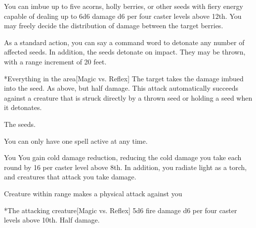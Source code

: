 \begin{spellheader}
\end{spellheader}
\begin{spelleffects}
    \spelleffect You can imbue up to five acorns, holly berries, or other seeds with fiery energy capable of dealing up to 6d6 damage \add d6 per four caster levels above 12th. You may freely decide the distribution of damage between the target berries.

    As a standard action, you can say a command word to detonate any number of affected seeds. In addition, the seeds detonate on impact. They may be thrown, with a range increment of 20 feet.
    \begin{spelltarget}*{Everything in the area}[Magic vs. Reflex]
        \spellsuccess The target takes the damage imbued into the seed.
        \spellfailure As above, but half damage.
        \spellspecial This attack automatically succeeds against a creature that is struck directly by a thrown seed or holding a seed when it detonates.
    \end{spelltarget}
     The seeds.
\end{spelleffects}
\begin{spellfooter}
    \spellnotes You can only have one  spell active at any time.
\end{spellfooter}

\begin{spellheader}
    \spelldur{\durshort \dismissable}
\end{spellheader}
\begin{spelleffects}
    \begin{spelltarget}{You}
        \spelleffect You gain cold damage reduction, reducing the cold damage you take each round by 16  per caster level above 8th. In addition, you radiate light as a torch, and creatures that attack you take damage.
    \end{spelltarget}
    \begin{spelltrigger}{Creature within \rngclose range makes a physical attack against you}
        \begin{spelltarget}*{The attacking creature}[Magic vs. Reflex]
            \spellsuccess 5d6 fire damage \add d6 per four caster levels above 10th.
            \spellfailure Half damage.
        \end{spelltarget}
    \end{spelltrigger}
\end{spelleffects}
\begin{spellfooter}
    
\end{spellfooter}

